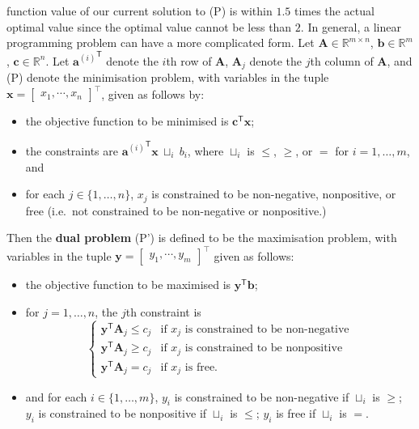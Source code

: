 function value of our current solution to (P) is within \(1.5\) times the
actual optimal value since the optimal value cannot be less than \(2\).
\newpage\noindent In general, a linear programming problem can have a more complicated
form. Let \(\mathbf{A} \in \mathbb{R}^{m\times n}\),
\(\mathbf{b} \in \mathbb{R}^m\), \(\mathbf{c} \in \mathbb{R}^n\). Let
\({\mathbf{a}^{(i)}}^\mathsf{T}\) denote the \(i\)th row of
\(\mathbf{A}\), \(\mathbf{A}_j\) denote the \(j\)th column of
\(\mathbf{A}\), and (P) denote the minimisation problem, with variables in the tuple
\(\mathbf{x} = \begin{bmatrix} x_1, \cdots,  x_n\end{bmatrix}^{\!\top}\), given as follows
by:
\begin{itemize}[noitemsep]
\item
  the objective function to be minimised is
  \(\mathbf{c}^\mathsf{T} \mathbf{x}\);
\item
  the constraints are ${\mathbf{a}^{(i)}}^\mathsf{T}\mathbf{x}~\sqcup_i~b_i$, where \(\sqcup_i\) is \(\leq\), \(\geq\), or \(=\) for
  \(i = 1,\ldots, m\), and 
\item
  for each \(j \in \{1,\ldots,n\}\), \(x_j\) is constrained to be
  non-negative, nonpositive, or free (i.e.~not constrained to be
  non-negative or nonpositive.)
\end{itemize}
Then the \textbf{dual problem} (P') is defined to be the maximisation problem,
with variables in the tuple
\(\mathbf{y} = \begin{bmatrix} y_1, \cdots, y_m\end{bmatrix}^{\!\top}\) given
as follows:
\begin{itemize}[noitemsep]
\item
  the objective function to be maximised is
  \(\mathbf{y}^\mathsf{T} \mathbf{b}\);
\item
  for \(j = 1,\ldots, n\), the \(j\)th constraint is \begin{equation*}
  \left \{\begin{array}{ll}
  \mathbf{y}^\mathsf{T}\mathbf{A}_j \leq c_j & \text{if } x_j \text{ is
  constrained to be non-negative} \\
  \mathbf{y}^\mathsf{T}\mathbf{A}_j \geq c_j & \text{if } x_j \text{ is
  constrained to be nonpositive} \\
  \mathbf{y}^\mathsf{T}\mathbf{A}_j = c_j & \text{if } x_j \text{ is free}.
  \end{array}\right.
  \end{equation*}
\item
  and for each \(i \in \{1,\ldots,m\}\), \(y_i\) is constrained to be
  non-negative if \(\sqcup_i\) is \(\geq\); \(y_i\) is constrained to be
  nonpositive if \(\sqcup_i\) is \(\leq\); \(y_i\) is free if
  \(\sqcup_i\) is \(=\).
\end{itemize}
